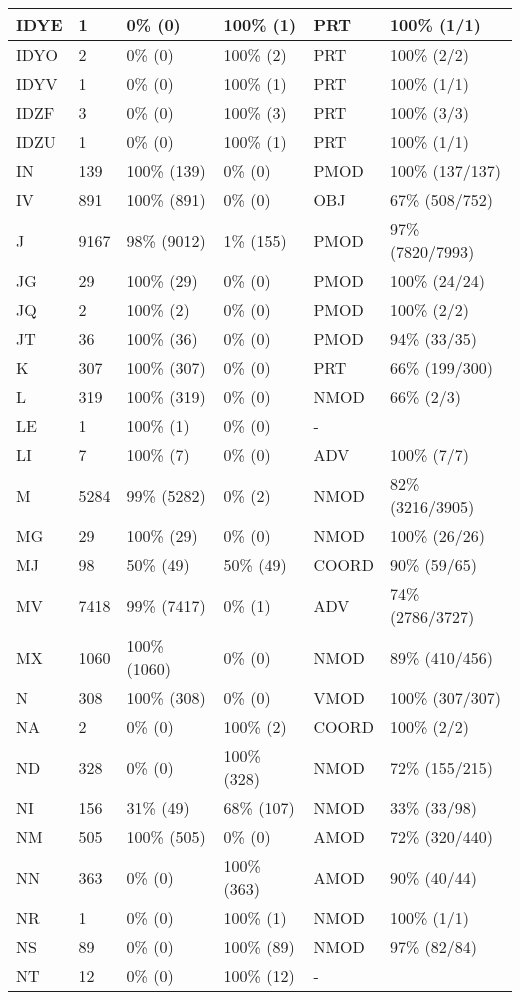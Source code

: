 \begin{figure*}
\begin{tabular}{|l|l|l|l||l|l|}
\hline
 IDYE & 1 & 0\% (0) & 100\% (1) & PRT & 100\% (1/1) \\ 
\hline
 IDYO & 2 & 0\% (0) & 100\% (2) & PRT & 100\% (2/2) \\ 
\hline
 IDYV & 1 & 0\% (0) & 100\% (1) & PRT & 100\% (1/1) \\ 
\hline
 IDZF & 3 & 0\% (0) & 100\% (3) & PRT & 100\% (3/3) \\ 
\hline
 IDZU & 1 & 0\% (0) & 100\% (1) & PRT & 100\% (1/1) \\ 
\hline
 IN & 139 & 100\% (139) & 0\% (0) & PMOD & 100\% (137/137) \\ 
\hline
 IV & 891 & 100\% (891) & 0\% (0) & OBJ & 67\% (508/752) \\ 
\hline
 J & 9167 & 98\% (9012) & 1\% (155) & PMOD & 97\% (7820/7993) \\ 
\hline
 JG & 29 & 100\% (29) & 0\% (0) & PMOD & 100\% (24/24) \\ 
\hline
 JQ & 2 & 100\% (2) & 0\% (0) & PMOD & 100\% (2/2) \\ 
\hline
 JT & 36 & 100\% (36) & 0\% (0) & PMOD & 94\% (33/35) \\ 
\hline
 K & 307 & 100\% (307) & 0\% (0) & PRT & 66\% (199/300) \\ 
\hline
 L & 319 & 100\% (319) & 0\% (0) & NMOD & 66\% (2/3) \\ 
\hline
 LE & 1 & 100\% (1) & 0\% (0) & - &  \\ 
\hline
 LI & 7 & 100\% (7) & 0\% (0) & ADV & 100\% (7/7) \\ 
\hline
 M & 5284 & 99\% (5282) & 0\% (2) & NMOD & 82\% (3216/3905) \\ 
\hline
 MG & 29 & 100\% (29) & 0\% (0) & NMOD & 100\% (26/26) \\ 
\hline
 MJ & 98 & 50\% (49) & 50\% (49) & COORD & 90\% (59/65) \\ 
\hline
 MV & 7418 & 99\% (7417) & 0\% (1) & ADV & 74\% (2786/3727) \\ 
\hline
 MX & 1060 & 100\% (1060) & 0\% (0) & NMOD & 89\% (410/456) \\ 
\hline
 N & 308 & 100\% (308) & 0\% (0) & VMOD & 100\% (307/307) \\ 
\hline
 NA & 2 & 0\% (0) & 100\% (2) & COORD & 100\% (2/2) \\ 
\hline
 ND & 328 & 0\% (0) & 100\% (328) & NMOD & 72\% (155/215) \\ 
\hline
 NI & 156 & 31\% (49) & 68\% (107) & NMOD & 33\% (33/98) \\ 
\hline
 NM & 505 & 100\% (505) & 0\% (0) & AMOD & 72\% (320/440) \\ 
\hline
 NN & 363 & 0\% (0) & 100\% (363) & AMOD & 90\% (40/44) \\ 
\hline
 NR & 1 & 0\% (0) & 100\% (1) & NMOD & 100\% (1/1) \\ 
\hline
 NS & 89 & 0\% (0) & 100\% (89) & NMOD & 97\% (82/84) \\ 
\hline
 NT & 12 & 0\% (0) & 100\% (12) & - &  \\ 
\hline
\end{tabular}
\end{figure*}
